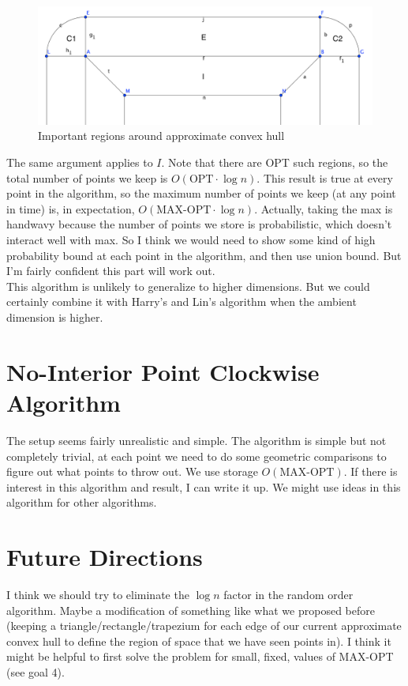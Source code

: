 \documentclass[12pt]{article}
\theoremstyle{definition}
\begin{document}
\begin{figure}
\includegraphics[width=\linewidth]{main_regions}
\caption{Important regions around approximate convex hull}\label{fig:tiger}
\end{figure}

\noindent The same argument applies to $I$. Note that there are OPT such regions, so the total number of points we keep is $O(\mbox{OPT} \cdot \log{n})$. This result is true at every point in the algorithm, so the maximum number of points we keep (at any point in time) is, in expectation, $O(\mbox{MAX-OPT} \cdot \log{n})$. Actually, taking the max is handwavy because the number of points we store is probabilistic, which doesn't interact well with max. So I think we would need to show some kind of high probability bound at each point in the algorithm, and then use union bound. But I'm fairly confident this part will work out.
\\

\noindent This algorithm is unlikely to generalize to higher dimensions. But we could certainly combine it with Harry's and Lin's algorithm when the ambient dimension is higher.

\section{No-Interior Point Clockwise Algorithm}

The setup seems fairly unrealistic and simple. The algorithm is simple but not completely trivial, at each point we need to do some geometric comparisons to figure out what points to throw out. We use storage $O(\mbox{MAX-OPT})$. If there is interest in this algorithm and result, I can write it up. We might use ideas in this algorithm for other algorithms.

\section{Future Directions}

I think we should try to eliminate the $\log{n}$ factor in the random order algorithm. Maybe a modification of something like what we proposed before (keeping a triangle/rectangle/trapezium for each edge of our current approximate convex hull to define the region of space that we have seen points in). I think it might be helpful to first solve the problem for small, fixed, values of MAX-OPT (see goal 4).
\end{document}

